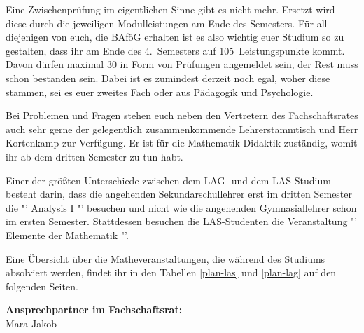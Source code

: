 Eine Zwischenprüfung im eigentlichen Sinne gibt es nicht mehr.
Ersetzt wird diese durch die jeweiligen Modulleistungen am Ende des Semesters.
Für all diejenigen von euch, die BAföG erhalten ist es also wichtig euer Studium so zu gestalten, dass ihr am Ende des 4.~Semesters auf 105~Leistungspunkte kommt.
Davon dürfen maximal 30 in Form von Prüfungen angemeldet sein, der Rest muss schon bestanden sein.
Dabei ist es zumindest derzeit noch egal, woher diese stammen, sei es euer zweites Fach oder aus Pädagogik und Psychologie.

Bei Problemen und Fragen stehen euch neben den Vertretern des Fachschaftsrates auch sehr gerne der gelegentlich zusammenkommende Lehrerstammtisch und Herr Kortenkamp zur Verfügung.
Er ist für die Mathematik-Didaktik zuständig, womit ihr ab dem dritten Semester zu tun habt.

Einer der größten Unterschiede zwischen dem LAG- und dem LAS-Studium besteht darin, dass die angehenden Sekundarschullehrer erst im dritten Semester die "' Analysis I "' besuchen und nicht wie die angehenden Gymnasiallehrer schon im ersten Semester.
Stattdessen besuchen die LAS-Studenten die Veranstaltung "' Elemente der Mathematik "'.

Eine Übersicht über die Matheveranstaltungen, die während des Studiums absolviert werden, findet ihr in den Tabellen \ref{plan-las} und \ref{plan-lag} auf den folgenden Seiten.

\textbf{Ansprechpartner im Fachschaftsrat:}\\
Mara Jakob\\



\label{studiengang_lehramt}

\label{studiengang_lag}

